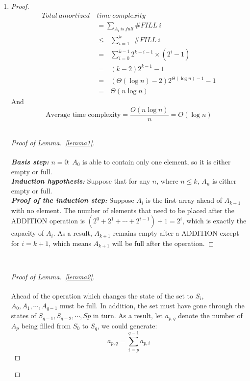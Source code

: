 \documentclass[12pt,a4paper]{article}
\makeatletter
\newtheorem*{solution}{Solution}
\theoremstyle{definition}
\renewenvironment{solution}[1][Solution] {\par\pushQED{\qed}\normalfont\topsep6\p@\@plus6\p@\relax\trivlist\item[\hskip\labelsep\bfseries#1\@addpunct{.}]\ignorespaces}{\popQED\endtrivlist\@endpefalse} \makeatother
\makeatother
\begin{document}
\begin{enumerate}
\begin{enumerate}
\begin{solution}
\begin{enumerate}
\begin{proof}
        \begin{equation}
        \begin{split}
            Total\ amortized\ &time\ complexity\\
           & =  \sum_{A_i\ is\ full} \# FILL\ i \\
            & \leq\ \ \  \sum_{i=1}^k\ \ \# FILL\ i \\
            &=\ \ \ \sum_{i=0}^{k-1} 2^{k-i-1} \times (2^i-1) \\
            &=\ \ \ (k-2)2^{k-1}-1\\
            &=\ \ \  (\Theta(\log n) -2)2^{\Theta(\log n)-1}-1\\
            &=\ \ \ \Theta (n\log n)
        \end{split}
        \end{equation}
        And $$\text{Average time complexity}=\frac{O(n\log n)}{n}=O(\log n)$$
        ~\\
        
        
        
        
        \begin{proof} [Proof of Lemma.~\ref{lemma1}] 
        ~\\ 
        ~\\
        \textbf{\textit{Basis step:}} $n=0$: $A_0$ is able to contain only one element, so it is either empty or full. 
        \\
        \textbf{\textit{Induction hypothesis:}} Suppose that for any $n$, where $n\leq k$, $A_n$ is either empty or full.
        \\
        \textbf{\textit{Proof of the induction step:}} Suppose $A_i$ is the first 
        array ahead of $A_{k+1}$ with no element. The number of elements that need to be placed after the \textsc{ADDITION} operation is $(2^0+2^1+\cdots+2^{i-1})+1=2^i$, which is exactly the capacity of $A_i$. As a result, $A_{k+1}$ remains empty after a \textsc{ADDITION} except for $i=k+1$, which means $A_{k+1}$ will be full after the operation.
        \end{proof}   
        ~\\
        \begin{proof} [Proof of Lemma.~\ref{lemma2}]
        ~\\
        ~\\
        Ahead of the operation which changes the state of the set to $S_i$, $A_0,A_1,\cdots,A_{q-1}$ must be full. In addition, the set must have gone through the states of $S_{q-1},S_{q-2},\cdots,S{p}$ in turn. As a result, let $a_{p,q}$ denote the number of $A_p$ being filled from $S_0$ to $S_q$,  we could generate:
        $$a_{p,q}=\sum_{i=p}^{q-1}a_{p,i}$$
        

\end{proof}
\end{proof}
\end{enumerate}
\end{solution}
\end{enumerate}
\end{enumerate}
\end{document}
